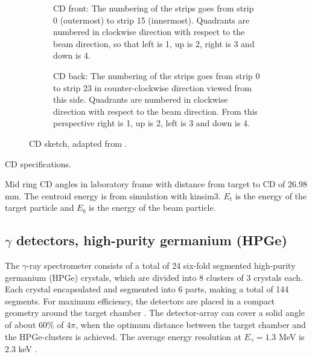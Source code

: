 \documentclass[twoside,english]{uiofysmaster/uiofysmaster}
\newcommand{\ga}{$\gamma$}
\begin{document}
\begin{figure}
	\centering
	\begin{subfigure}{\textwidth}
		
		\caption{CD front: The numbering of the strips goes from strip 0 (outermost) to strip 15 (innermost). Quadrants are numbered in clockwise direction with respect to the beam direction, so that left is 1, up is 2, right is 3 and down is 4.}
		\label{fig:CD-F}
	\end{subfigure}
	\begin{subfigure}{\textwidth}
		
		\caption{CD back: The numbering of the strips goes from strip 0 to strip 23 in counter-clockwise direction viewed from this side. Quadrants are numbered in clockwise direction with respect to the beam direction. From this perspective right is 1, up is 2, left is 3 and down is 4.}
		\label{fig:CD-B}
	\end{subfigure}
	\caption{CD sketch, adapted from \cite{NWarr-CD}.}
	\label{fig:CD-FB}
\end{figure}


\begin{table}[ht] 
    \centering 
    \caption{CD specifications.}
	
	\label{tab:CD_spec}
\end{table}


\begin{table}[ht] 
    \centering 
    \caption{Mid ring CD angles in laboratory frame with distance from target to CD of 26.98 mm. The centroid energy is from simulation with kinsim3. $E_t$ is the energy of the target particle and $E_b$ is the energy of the beam particle.}
	
	\label{tab:CD_angles}
\end{table}


\subsection{\texorpdfstring{$\gamma$}{Gamma} detectors, high-purity germanium (HPGe)}
The \ga-ray spectrometer consists of a total of 24 six-fold segmented high-purity germanium (HPGe) crystals, which are divided into 8 clusters of 3 crystals each. Each crystal encapsulated and segmented into 6 parts, making a total of 144 segments. For maximum efficiency, the detectors are placed in a compact geometry around the target chamber \cite{NWarr-HPGe, MB-spect}. The detector-array can cover a solid angle of about 60\% of 4$\pi$, when the optimum distance between the target chamber and the HPGe-clusters is achieved. The average energy resolution at $E_\gamma = 1.3$ MeV is 2.3 keV \cite{Butler2017}. 
\end{document}
